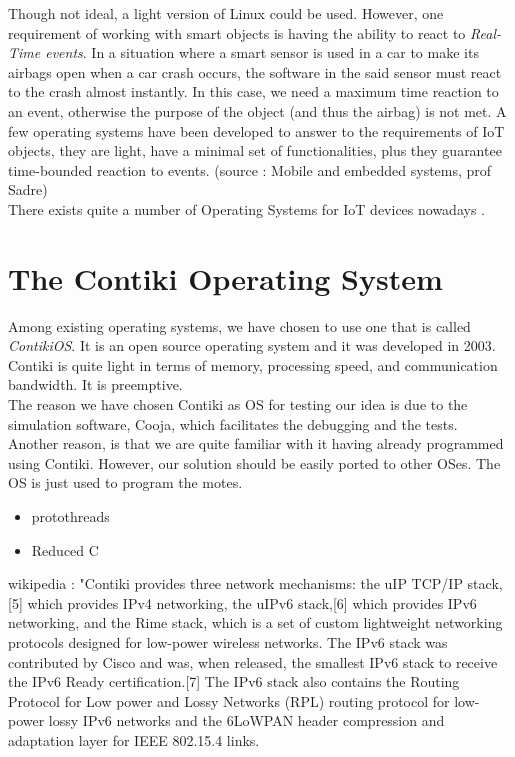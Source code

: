 Though not ideal, a light version of Linux could be used. However, one requirement of working with smart objects is having the ability to react to \textit{Real-Time events}. In a situation where a smart sensor is used in a car to make its airbags open when a car crash occurs, the software in the said sensor must react to the crash almost instantly. In this case, we need a maximum time reaction to an event, otherwise the purpose of the object (and thus the airbag) is not met. A few operating systems have been developed to answer to the requirements of IoT objects, they are light, have a minimal set of functionalities, plus they guarantee time-bounded reaction to events. (source : Mobile and embedded systems, prof Sadre)\\

There exists quite a number of Operating Systems for IoT devices nowadays \cite{website:iot_os}.

\section{The Contiki Operating System}

Among existing operating systems, we have chosen to use one that is called \textit{ContikiOS}. It is an open source operating system and it was developed in 2003. Contiki is quite light in terms of memory, processing speed, and communication bandwidth. It is preemptive.\\

The reason we have chosen Contiki as OS for testing our idea is due to the simulation software, Cooja, which facilitates the debugging and the tests. Another reason, is that we are quite familiar with it having already programmed using Contiki. However, our solution should be easily ported to other OSes. The OS is just used to program the motes.\\

\begin{itemize}
\item protothreads
\item Reduced C
\end{itemize}
wikipedia : "Contiki provides three network mechanisms: the uIP TCP/IP stack,[5] which provides IPv4 networking, the uIPv6 stack,[6] which provides IPv6 networking, and the Rime stack, which is a set of custom lightweight networking protocols designed for low-power wireless networks. The IPv6 stack was contributed by Cisco and was, when released, the smallest IPv6 stack to receive the IPv6 Ready certification.[7] The IPv6 stack also contains the Routing Protocol for Low power and Lossy Networks (RPL) routing protocol for low-power lossy IPv6 networks and the 6LoWPAN header compression and adaptation layer for IEEE 802.15.4 links.

